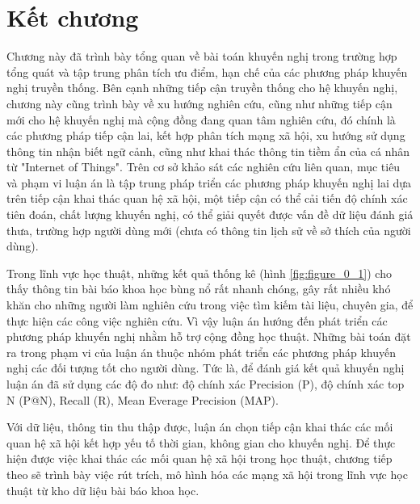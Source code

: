 \section{Kết chương}
Chương này đã trình bày tổng quan về bài toán khuyến nghị trong trường hợp tổng quát và tập trung phân tích ưu điểm, hạn chế của các phương pháp khuyến nghị truyền thống. Bên cạnh những tiếp cận truyền thống cho hệ khuyến nghị, chương này cũng trình bày về xu hướng nghiên cứu, cũng như những tiếp cận mới cho hệ khuyến nghị mà cộng đồng đang quan tâm nghiên cứu, đó chính là các phương pháp tiếp cận lai, kết hợp phân tích mạng xã hội, xu hướng sử dụng thông tin nhận biết ngữ cảnh, cũng như khai thác thông tin tiềm ẩn của cá nhân từ "Internet of Things". Trên cơ sở khảo sát các nghiên cứu liên quan, mục tiêu và phạm vi luận án là tập trung pháp triển các phương pháp khuyến nghị lai dựa trên tiếp cận khai thác quan hệ xã hội, một tiếp cận có thể cải tiến độ chính xác tiên đoán, chất lượng khuyến nghị, có thể giải quyết được vấn đề dữ liệu đánh giá thưa, trường hợp người dùng mới (chưa có thông tin lịch sử về sở thích của người dùng).

Trong lĩnh vực học thuật, những kết quả thống kê (hình \ref{fig:figure_0_1}) cho thấy thông tin bài báo khoa học bùng nổ rất nhanh chóng, gây rất nhiều khó khăn cho những người làm nghiên cứu trong việc tìm kiếm tài liệu, chuyên gia, để thực hiện các công việc nghiên cứu. Vì vậy luận án hướng đến phát triển các phương pháp khuyến nghị nhằm hỗ trợ cộng đồng học thuật. Những bài toán đặt ra trong phạm vi của luận án thuộc nhóm phát triển các phương pháp khuyến nghị các đối tượng tốt cho người dùng. Tức là, để đánh giá kết quả khuyến nghị luận án đã sử dụng các độ đo như: độ chính xác Precision (P), độ chính xác top N (P@N), Recall (R), Mean Everage Precision (MAP).

Với dữ liệu, thông tin thu thập được, luận án chọn tiếp cận khai thác các mối quan hệ xã hội kết hợp yếu tố thời gian, không gian cho khuyến nghị. Để thực hiện được việc khai thác các mối quan hệ xã hội trong học thuật, chương tiếp theo sẽ trình bày việc rút trích, mô hình hóa các mạng xã hội trong lĩnh vực học thuật từ kho dữ liệu bài báo khoa học.
